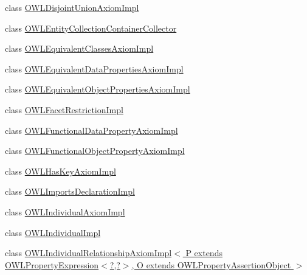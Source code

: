 \begin{DoxyCompactItemize}
\item 
class \hyperlink{classuk_1_1ac_1_1manchester_1_1cs_1_1owl_1_1owlapi_1_1_o_w_l_disjoint_union_axiom_impl}{O\-W\-L\-Disjoint\-Union\-Axiom\-Impl}
\item 
class \hyperlink{classuk_1_1ac_1_1manchester_1_1cs_1_1owl_1_1owlapi_1_1_o_w_l_entity_collection_container_collector}{O\-W\-L\-Entity\-Collection\-Container\-Collector}
\item 
class \hyperlink{classuk_1_1ac_1_1manchester_1_1cs_1_1owl_1_1owlapi_1_1_o_w_l_equivalent_classes_axiom_impl}{O\-W\-L\-Equivalent\-Classes\-Axiom\-Impl}
\item 
class \hyperlink{classuk_1_1ac_1_1manchester_1_1cs_1_1owl_1_1owlapi_1_1_o_w_l_equivalent_data_properties_axiom_impl}{O\-W\-L\-Equivalent\-Data\-Properties\-Axiom\-Impl}
\item 
class \hyperlink{classuk_1_1ac_1_1manchester_1_1cs_1_1owl_1_1owlapi_1_1_o_w_l_equivalent_object_properties_axiom_impl}{O\-W\-L\-Equivalent\-Object\-Properties\-Axiom\-Impl}
\item 
class \hyperlink{classuk_1_1ac_1_1manchester_1_1cs_1_1owl_1_1owlapi_1_1_o_w_l_facet_restriction_impl}{O\-W\-L\-Facet\-Restriction\-Impl}
\item 
class \hyperlink{classuk_1_1ac_1_1manchester_1_1cs_1_1owl_1_1owlapi_1_1_o_w_l_functional_data_property_axiom_impl}{O\-W\-L\-Functional\-Data\-Property\-Axiom\-Impl}
\item 
class \hyperlink{classuk_1_1ac_1_1manchester_1_1cs_1_1owl_1_1owlapi_1_1_o_w_l_functional_object_property_axiom_impl}{O\-W\-L\-Functional\-Object\-Property\-Axiom\-Impl}
\item 
class \hyperlink{classuk_1_1ac_1_1manchester_1_1cs_1_1owl_1_1owlapi_1_1_o_w_l_has_key_axiom_impl}{O\-W\-L\-Has\-Key\-Axiom\-Impl}
\item 
class \hyperlink{classuk_1_1ac_1_1manchester_1_1cs_1_1owl_1_1owlapi_1_1_o_w_l_imports_declaration_impl}{O\-W\-L\-Imports\-Declaration\-Impl}
\item 
class \hyperlink{classuk_1_1ac_1_1manchester_1_1cs_1_1owl_1_1owlapi_1_1_o_w_l_individual_axiom_impl}{O\-W\-L\-Individual\-Axiom\-Impl}
\item 
class \hyperlink{classuk_1_1ac_1_1manchester_1_1cs_1_1owl_1_1owlapi_1_1_o_w_l_individual_impl}{O\-W\-L\-Individual\-Impl}
\item 
class \hyperlink{classuk_1_1ac_1_1manchester_1_1cs_1_1owl_1_1owlapi_1_1_o_w_l_individual_relationship_axiom_impl_2e65835829d24af56b0ce2178ea3b61b}{O\-W\-L\-Individual\-Relationship\-Axiom\-Impl$<$ P extends O\-W\-L\-Property\-Expression$<$?,?$>$, O extends O\-W\-L\-Property\-Assertion\-Object $>$}

\end{DoxyCompactItemize}
